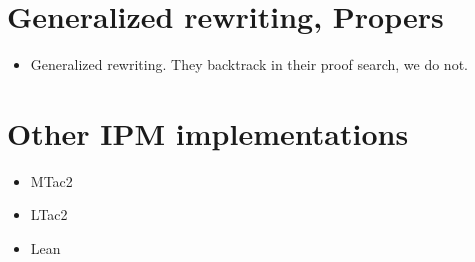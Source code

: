 \documentclass[thesis.tex]{subfiles}
\begin{document}
\section{Generalized rewriting, Propers}
\begin{itemize}
    \item \cite{sozeauNewLookGeneralized2009} Generalized rewriting. They backtrack in their proof search, we do not.
\end{itemize}

\section{Other IPM implementations}
\begin{itemize}
    \item MTac2
    \item LTac2
    \item Lean
\end{itemize}
\end{document}
